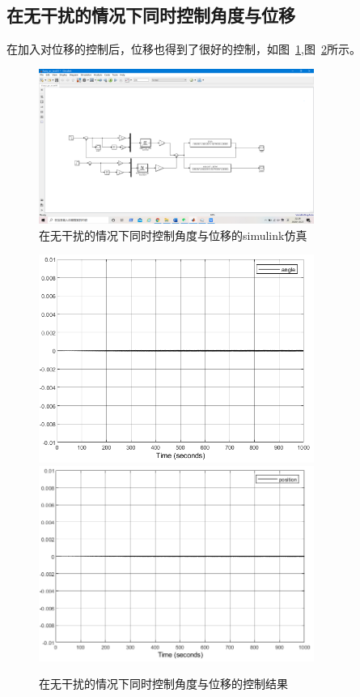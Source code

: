 \subsection{在无干扰的情况下同时控制角度与位移}
在加入对位移的控制后，位移也得到了很好的控制，如图~\ref{fig:x0},图~\ref{fig:x}所示。

\begin{figure}[hbpt]
\centering
\includegraphics[width=9cm]{x0.png}

\caption{在无干扰的情况下同时控制角度与位移的simulink仿真}\label{fig:x0}
\end{figure}

\begin{figure}[hbpt]
\centering
\includegraphics[width=9cm]{x1.png}
\includegraphics[width=9cm]{x2.png}
\caption{在无干扰的情况下同时控制角度与位移的控制结果}\label{fig:x}
\end{figure}

